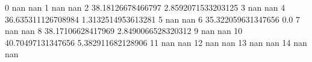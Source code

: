 0 nan nan
1 nan nan
2 38.18126678466797 2.8592071533203125
3 nan nan
4 36.635311126708984 1.3132514953613281
5 nan nan
6 35.322059631347656 0.0
7 nan nan
8 38.17106628417969 2.8490066528320312
9 nan nan
10 40.70497131347656 5.382911682128906
11 nan nan
12 nan nan
13 nan nan
14 nan nan

